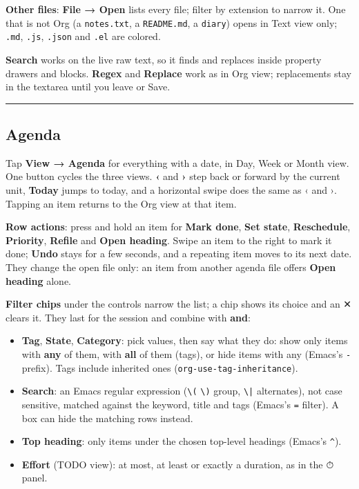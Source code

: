 \documentclass[11pt]{article}
\begin{document}
\textbf{Other files}: \textbf{File → Open} lists every file; filter by extension to narrow it. One that is not Org (a \texttt{notes.txt}, a \texttt{README.md}, a \texttt{diary}) opens in Text view only; \texttt{.md}, \texttt{.js}, \texttt{.json} and \texttt{.el} are colored.

\textbf{Search} works on the live raw text, so it finds and replaces inside property drawers and blocks. \textbf{Regex} and \textbf{Replace} work as in Org view; replacements stay in the textarea until you leave or Save.

\noindent\rule{\textwidth}{0.5pt}

\subsection{Agenda}
\label{sec:org38ac5a3}
Tap \textbf{View → Agenda} for everything with a date, in Day, Week or Month view. One button cycles the three views. \textbf{‹} and \textbf{›} step back or forward by the current unit, \textbf{Today} jumps to today, and a horizontal swipe does the same as ‹ and ›. Tapping an item returns to the Org view at that item.

\textbf{Row actions}: press and hold an item for \textbf{Mark done}, \textbf{Set state}, \textbf{Reschedule}, \textbf{Priority}, \textbf{Refile} and \textbf{Open heading}. Swipe an item to the right to mark it done; \textbf{Undo} stays for a few seconds, and a repeating item moves to its next date. They change the open file only: an item from another agenda file offers \textbf{Open heading} alone.

\textbf{Filter chips} under the controls narrow the list; a chip shows its choice and an ✕ clears it. They last for the session and combine with \textbf{and}:

\begin{itemize}
\item \textbf{Tag}, \textbf{State}, \textbf{Category}: pick values, then say what they do: show only items with \textbf{any} of them, with \textbf{all} of them (tags), or hide items with any (Emacs's \texttt{-} prefix). Tags include inherited ones (\texttt{org-use-tag-inheritance}).
\item \textbf{Search}: an Emacs regular expression (\texttt{\textbackslash{}(} \texttt{\textbackslash{})} group, \texttt{\textbackslash{}|} alternates), not case sensitive, matched against the keyword, title and tags (Emacs's \texttt{=} filter). A box can hide the matching rows instead.
\item \textbf{Top heading}: only items under the chosen top-level headings (Emacs's \texttt{\textasciicircum{}}).
\item \textbf{Effort} (TODO view): at most, at least or exactly a duration, as in the ⏱ panel.
\end{itemize}
\end{document}
